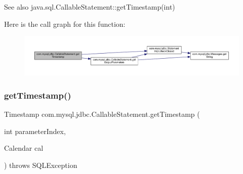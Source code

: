 \begin{DoxySeeAlso}{See also}
java.\+sql.\+Callable\+Statement\+::get\+Timestamp(int) 
\end{DoxySeeAlso}
Here is the call graph for this function\+:\nopagebreak
\begin{figure}[H]
\begin{center}
\leavevmode
\includegraphics[width=350pt]{classcom_1_1mysql_1_1jdbc_1_1_callable_statement_aa0263246593571a7c5a1caf704ad3eec_cgraph}
\end{center}
\end{figure}
\mbox{\label{classcom_1_1mysql_1_1jdbc_1_1_callable_statement_a66ee1944b2e584b14ae505fccda376e7}} 
\subsubsection{\texorpdfstring{get\+Timestamp()}{getTimestamp()}\hspace{0.1cm}{\footnotesize\ttfamily [2/4]}}
{\footnotesize\ttfamily Timestamp com.\+mysql.\+jdbc.\+Callable\+Statement.\+get\+Timestamp (\begin{DoxyParamCaption}\item[{int}]{parameter\+Index,  }\item[{Calendar}]{cal }\end{DoxyParamCaption}) throws S\+Q\+L\+Exception}

